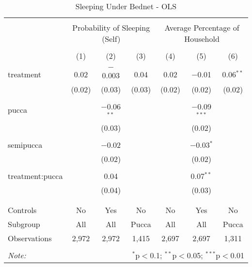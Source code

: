 
\begin{table}[!htbp] \centering 
  \caption{Sleeping Under Bednet - OLS} 
  \label{tbl:Sleeping Under Bednet - OLS} 
\begin{tabular}{@{\extracolsep{5pt}}lcccccc} 
\\[-1.8ex]\hline 
\hline \\[-1.8ex] 
 & \multicolumn{3}{c}{Probability of Sleeping (Self)} & \multicolumn{3}{c}{Average Percentage of Household} \\ 
\\[-1.8ex] & (1) & (2) & (3) & (4) & (5) & (6)\\ 
\hline \\[-1.8ex] 
 treatment & 0.02 & $-$0.003 & 0.04 & 0.02 & $-$0.01 & 0.06$^{**}$ \\ 
  & (0.02) & (0.03) & (0.03) & (0.02) & (0.02) & (0.02) \\ 
  & & & & & & \\ 
 pucca &  & $-$0.06$^{**}$ &  &  & $-$0.09$^{***}$ &  \\ 
  &  & (0.03) &  &  & (0.02) &  \\ 
  & & & & & & \\ 
 semipucca &  & $-$0.02 &  &  & $-$0.03$^{*}$ &  \\ 
  &  & (0.02) &  &  & (0.02) &  \\ 
  & & & & & & \\ 
 treatment:pucca &  & 0.04 &  &  & 0.07$^{**}$ &  \\ 
  &  & (0.04) &  &  & (0.03) &  \\ 
  & & & & & & \\ 
\hline \\[-1.8ex] 
Controls & No & Yes & No & No & Yes & No \\ 
Subgroup & All & All & Pucca & All & All & Pucca \\ 
Observations & 2,972 & 2,972 & 1,415 & 2,697 & 2,697 & 1,311 \\ 
\hline 
\hline \\[-1.8ex] 
\textit{Note:}  & \multicolumn{6}{r}{$^{*}$p$<$0.1; $^{**}$p$<$0.05; $^{***}$p$<$0.01} \\ 
\end{tabular} 
\end{table} 
